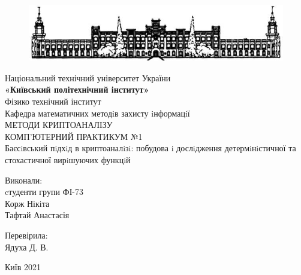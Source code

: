 \begin{center}
	\begin{figure}[ht]
		\centering
		\includegraphics[width=0.8\linewidth]{picture.png}	
	\end{figure}
	\hfill \break
	\footnotesize{Національний технічний університет України}\\ 
	\small{\textbf{«Київський політехнічний інститут»}}\\
	\hfill \break
	\normalsize{Фізико технічний інститут}\\
	\hfill \break
	\normalsize{Кафедра математичних методiв захисту iнформацiї}\\
	\hfill\break
	\LARGE{МЕТОДИ КРИПТОАНАЛІЗУ}\\
	\LARGE{КОМП’ЮТЕРНИЙ ПРАКТИКУМ №1}\\
	\hfill \break
	\Large{Баєсiвський пiдхiд в криптоаналiзi: побудова i
	дослiдження детермiнiстичної та стохастичної
	вирiшуючих функцiй}\\
    \hfill \break
    \hfill \break
	\hfill \break
	\hfill \break
	\hfill \break
	\hfill \break
	\end{center}
	
	
	\begin{flushright}
	Виконали:\\
	cтуденти групи ФІ-73\\
    Корж Нікіта\\
	Тафтай Анастасія\\
	\end{flushright}

	\begin{flushright}
		Перевірила:\\
		Ядуха Д. В.

		\hfill \break
		\hfill \break
	\end{flushright}
	
	\thispagestyle{empty}
	\begin{center} Київ 2021\end{center}